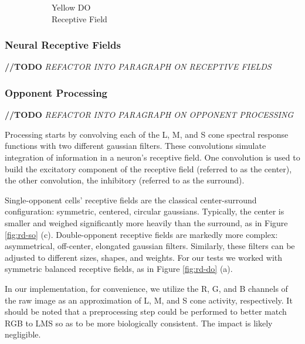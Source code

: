 \documentclass[journal,onecolumn]{IEEEtran}
\begin{document}
\begin{figure}
\begin{subfigure}{0.3\textwidth}
{
    }
    \caption{Yellow DO \\ Receptive Field} \label{fig:do-rf-inputs-yellow}
    \end{subfigure}%
    \caption{}  \label{fig:do-rf-inputs}
\end{figure}

\subsubsection*{Neural Receptive Fields}

\textbf{//TODO} \textit{REFACTOR INTO PARAGRAPH ON RECEPTIVE FIELDS}

\subsubsection*{Opponent Processing}

\textbf{//TODO} \textit{REFACTOR INTO PARAGRAPH ON OPPONENT PROCESSING}

Processing starts by convolving each of the L, M, and S cone spectral response functions with two different gaussian filters. These convolutions simulate integration of information in a neuron's receptive field. One convolution is used to build the excitatory component of the receptive field (referred to as the center), the other convolution, the inhibitory (referred to as the surround).

Single-opponent cells' receptive fields are the classical center-surround configuration: symmetric, centered, circular gaussians. Typically, the center is smaller and weighed significantly more heavily than the surround, as in Figure \ref{fig:rd-so} (c). Double-opponent receptive fields are markedly more complex: asymmetrical, off-center, elongated gaussian filters. Similarly, these filters can be adjusted to different sizes, shapes, and weights. For our tests we worked with symmetric balanced receptive fields, as in Figure \ref{fig:rd-do} (a).

In our implementation, for convenience, we utilize the R, G, and B channels of the raw image as an approximation of L, M, and S cone activity, respectively. It should be noted that a preprocessing step could be performed to better match RGB to LMS so as to be more biologically consistent. The impact is likely negligible.
\end{document}
